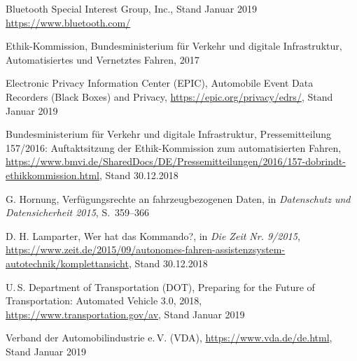 \documentclass[twoside,a4paper,12pt]{article}
\begin{document}
\cleardoublepage
\begin{thebibliography}{99}

 Bluetooth Special Interest Group, Inc., Stand Januar 2019\\ \url{https://www.bluetooth.com/}

 Ethik-Kommission, Bundesministerium für Verkehr und digitale Infrastruktur, Automatisiertes und
Vernetztes Fahren, 2017

 Electronic Privacy Information Center (EPIC), Automobile Event Data Recorders (Black Boxes) and Privacy,
\url{https://epic.org/privacy/edrs/}, Stand Januar 2019

 Bundesministerium für Verkehr und digitale Infrastruktur, Pressemitteilung 157/2016: Auftaktsitzung der Ethik-Kommission zum automatisierten Fahren,\\ 
\url{https://www.bmvi.de/SharedDocs/DE/Pressemitteilungen/2016/157-dobrindt-ethikkommission.html}, Stand 30.12.2018

 G. Hornung, Verfügungsrechte an fahrzeugbezogenen Daten, in \textit{Datenschutz und Datensicherheit 2015}, \mbox{S. 359--366}

 D. H. Lamparter, Wer hat das Kommando?, in \textit{Die Zeit Nr. 9/2015}, \\
\url{https://www.zeit.de/2015/09/autonomes-fahren-assistenzsystem-autotechnik/komplettansicht}, Stand 30.12.2018

 U.\,S. Department of Transportation (DOT), Preparing for the Future of Transportation: Automated Vehicle 3.0, 2018,
\url{https://www.transportation.gov/av}, Stand Januar 2019

 Verband der Automobilindustrie e.\,V. (VDA), \url{https://www.vda.de/de.html}, Stand Januar 2019

\end{thebibliography}

\newpage
\end{document}
